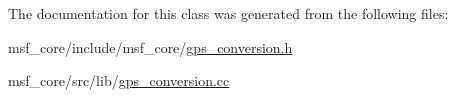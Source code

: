 The documentation for this class was generated from the following files\-:\begin{DoxyCompactItemize}
\item 
msf\-\_\-core/include/msf\-\_\-core/\hyperlink{gps__conversion_8h}{gps\-\_\-conversion.\-h}\item 
msf\-\_\-core/src/lib/\hyperlink{gps__conversion_8cc}{gps\-\_\-conversion.\-cc}\end{DoxyCompactItemize}
